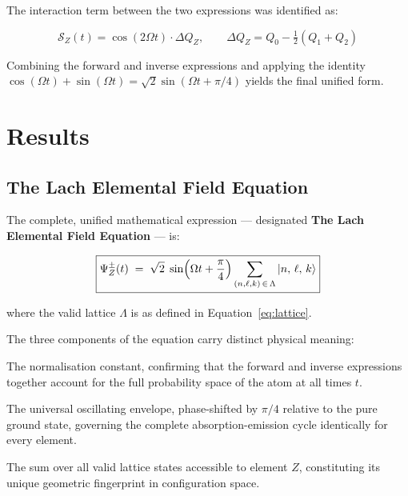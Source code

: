 \documentclass[12pt, a4paper]{article}
\newcommand{\Int}{\mathcal{S}}           %
\newcommand{\Lattice}{\Lambda}           %
\newcommand{\Psipm}{\Psi_{Z}^{\pm}}     %
\newcommand{\DQ}{\Delta Q_{Z}}          %
\begin{document}
The interaction term between the two expressions was identified as:

\begin{equation}
  \Int_Z(t) = \cos(2\Omega t)\cdot\DQ, \qquad
  \DQ = Q_0 - \tfrac{1}{2}(Q_1 + Q_2)
  \label{eq:interaction}
\end{equation}

Combining the forward and inverse expressions and applying the identity
$\cos(\Omega t) + \sin(\Omega t) = \sqrt{2}\sin(\Omega t + \pi/4)$ yields the
final unified form.

\section{Results}
\label{sec:results}

\subsection{The Lach Elemental Field Equation}

The complete, unified mathematical expression --- designated
\textbf{The Lach Elemental Field Equation} --- is:

\begin{equation}
  \boxed{
    \Psipm(t) \;=\; \sqrt{2}\;\sin\!\left(\Omega t + \frac{\pi}{4}\right)
    \sum_{(n,\ell,k)\,\in\,\Lattice} \ket{n,\, \ell,\, k}
  }
  \label{eq:lach}
\end{equation}

where the valid lattice $\Lattice$ is as defined in Equation~\eqref{eq:lattice}.

The three components of the equation carry distinct physical meaning:

\begin{description}[leftmargin=2em, style=nextline]
  \item[$\sqrt{2}$]
    The normalisation constant, confirming that the forward and inverse expressions
    together account for the full probability space of the atom at all times $t$.

  \item[$\sin(\Omega t + \pi/4)$]
    The universal oscillating envelope, phase-shifted by $\pi/4$ relative to the pure
    ground state, governing the complete absorption-emission cycle identically for every
    element.

  \item[$\displaystyle\sum_{(n,\ell,k)\,\in\,\Lattice}\ket{n,\ell,k}$]
    The sum over all valid lattice states accessible to element $Z$, constituting its
    unique geometric fingerprint in configuration space.
\end{description}
\end{document}
